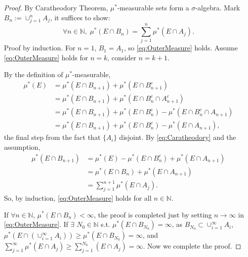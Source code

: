 \documentclass{article}
\newcommand{\cp}[1]{\cup_{#1=1}^{\infty}}
\newcommand{\sm}[1]{\sum_{#1=1}^{\infty}}
\begin{document}
\begin{proof}
    By Caratheodory Theorem, $\mu^{*}$-measurable sets 
    form a $\sigma$-algebra. 
    Mark $B_{n}:=\cup_{j=1}^{n}A_{j}$, 
    it suffices to show:
    \begin{equation}
        \label{eq:OuterMeasure}
        \forall n\in\mathbb{N},
        \;\mu^{*}(E\cap B_{n})
        =\sum_{j=1}^{n}\mu^{*}(E\cap A_{j}).
    \end{equation}
    Proof by induction. For $n=1$, $B_{1}=A_{1}$, 
    so \eqref{eq:OuterMeasure} holds. 
    Assume \eqref{eq:OuterMeasure} holds for $n=k$, consider $n=k+1$. 

    By the definition of $\mu^{*}$-measurable, 
    \begin{equation}
        \label{eq:Caratheodory}
        \begin{aligned}
            \mu^{*}(E)&=\mu^{*}(E\cap B_{n+1})
            +\mu^{*}(E\cap B_{n+1}^{c})\\
            &=\mu^{*}(E\cap B_{n+1})
            +\mu^{*}(E\cap B_{n}^{c}\cap A_{n+1}^{c})\\
            &=\mu^{*}(E\cap B_{n+1})+\mu^{*}(E\cap B_{n}^{c})
            -\mu^{*}(E\cap B_{n}^{c}\cap A_{n+1})\\
            &=\mu^{*}(E\cap B_{n+1})+\mu^{*}(E\cap B_{n}^{c})
            -\mu^{*}(E\cap A_{n+1}),
        \end{aligned}
    \end{equation}
    the final step from the fact that $\{A_{i}\}$ disjoint. 
    By \eqref{eq:Caratheodory} and the assumption,
    \begin{equation}
        \label{eq:Caratheodory2}
        \begin{aligned}
            \mu^{*}(E\cap B_{n+1})
            &=\mu^{*}(E)-\mu^{*}(E\cap B_{n}^{c})
            +\mu^{*}(E\cap A_{n+1})\\
            &=\mu^{*}(E\cap B_{n})+\mu^{*}(E\cap A_{n+1})\\
            &=\sum_{j=1}^{n+1}\mu^{*}(E\cap A_{j}).
        \end{aligned}
    \end{equation}
    So, by induction, \eqref{eq:OuterMeasure} 
    holds for all $n\in\mathbb{N}$.

    If $\forall n\in\mathbb{N}$, $\mu^{*}(E\cap B_{n})<\infty$, 
    the proof is completed 
    just by setting $n\rightarrow\infty$ in \eqref{eq:OuterMeasure}.
    If $\exists$ $N_{0}\in\mathbb{N}$ s.t. 
    $\mu^{*}(E\cap B_{N_{0}})=\infty$, 
    as $B_{N_{0}}\subset\cp{i}A_{i}$, 
    $\mu^{*}(E\cap(\cp{i}A_{i}))\ge\mu^{*}(E\cap B_{N_{0}})=\infty$, 
    and $\sm{j}\mu^{*}(E\cap A_{j})\ge\sum_{j=1}^{N_{0}}(E\cap A_{j})
    =\infty$. Now we complete the proof.\qedhere
\end{proof}
\end{document}
